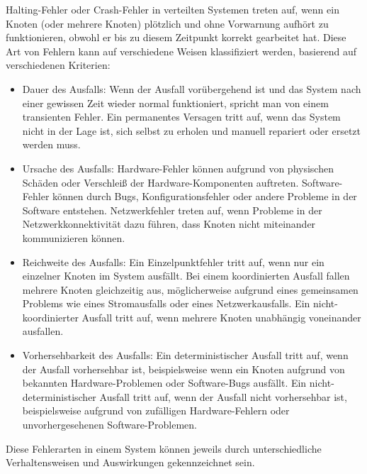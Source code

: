 Halting-Fehler oder Crash-Fehler in verteilten Systemen treten auf, wenn ein Knoten (oder mehrere Knoten) plötzlich und ohne Vorwarnung aufhört zu funktionieren, obwohl er bis zu diesem Zeitpunkt korrekt gearbeitet hat. Diese Art von Fehlern kann auf verschiedene Weisen klassifiziert werden, basierend auf verschiedenen Kriterien:
\begin{itemize}
\item Dauer des Ausfalls: Wenn der Ausfall vorübergehend ist und das System nach einer gewissen Zeit wieder normal funktioniert, spricht man von einem transienten Fehler. Ein permanentes Versagen tritt auf, wenn das System nicht in der Lage ist, sich selbst zu erholen und manuell repariert oder ersetzt werden muss.
\item Ursache des Ausfalls: Hardware-Fehler können aufgrund von physischen Schäden oder Verschleiß der Hardware-Komponenten auftreten. Software-Fehler können durch Bugs, Konfigurationsfehler oder andere Probleme in der Software entstehen. Netzwerkfehler treten auf, wenn Probleme in der Netzwerkkonnektivität dazu führen, dass Knoten nicht miteinander kommunizieren können.
\item Reichweite des Ausfalls: Ein Einzelpunktfehler tritt auf, wenn nur ein einzelner Knoten im System ausfällt. Bei einem koordinierten Ausfall fallen mehrere Knoten gleichzeitig aus, möglicherweise aufgrund eines gemeinsamen Problems wie eines Stromausfalls oder eines Netzwerkausfalls. Ein nicht-koordinierter Ausfall tritt auf, wenn mehrere Knoten unabhängig voneinander ausfallen.
\item Vorhersehbarkeit des Ausfalls: Ein deterministischer Ausfall tritt auf, wenn der Ausfall vorhersehbar ist, beispielsweise wenn ein Knoten aufgrund von bekannten Hardware-Problemen oder Software-Bugs ausfällt. Ein nicht-deterministischer Ausfall tritt auf, wenn der Ausfall nicht vorhersehbar ist, beispielsweise aufgrund von zufälligen Hardware-Fehlern oder unvorhergesehenen Software-Problemen.
\end{itemize} 
Diese Fehlerarten in einem System können jeweils durch unterschiedliche Verhaltensweisen und Auswirkungen gekennzeichnet sein.
